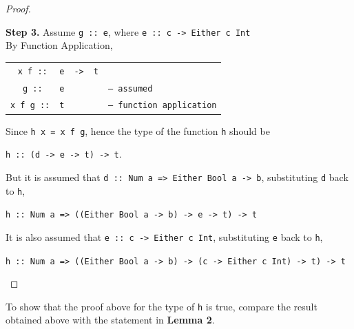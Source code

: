 \documentclass[12pt]{article}
\newcommand{\haskell}{\texttt}
\begin{document}
\begin{proof}
\begin{mdframed}
\flushleft\par\noindent \textbf{Step 3.} Assume \haskell{g :: e}, where \haskell{e :: c -> Either c Int} \\
\noindent By Function Application, \\
{\centering
    \begin{tabular}{cllll}
    \haskell{ x f  ::} & \haskell{e} & \haskell{->} & \haskell{t} & \\
    \haskell{  g   ::} & \haskell{e} &              &             & \haskell{-- assumed} \\ \cline{1-4}
    \haskell{x f g ::} & \haskell{t} &              &             & \haskell{-- function application}
    \end{tabular}
\par}
\bigskip

\flushleft\par\noindent Since \haskell{h x = x f g}, hence the type of the function \haskell{h} should be \\
{\centering
    \haskell{h :: (d -> e -> t) -> t}.
\par}
\bigskip

But it is assumed that \haskell{d :: Num a => Either Bool a -> b}, substituting \haskell{d} back to \haskell{h}, \\
{\centering
    \haskell{h :: Num a => ((Either Bool a -> b) -> e -> t) -> t}
\par}
\bigskip

It is also assumed that \haskell{e :: c -> Either c Int}, substituting \haskell{e} back to \haskell{h}, \\
{\centering
    \haskell{h :: Num a => ((Either Bool a -> b) -> (c -> Either c Int) -> t) -> t}
\par}
\end{mdframed}
\end{proof}

To show that the proof above for the type of \haskell{h} is true, compare the result obtained above with the statement in \textbf{Lemma 2}.
\bigskip
\end{document}
